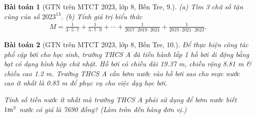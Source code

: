 \documentclass{article}
\newtheorem{baitoan}{Bài toán}
\begin{document}
\begin{baitoan}[GTN trên MTCT 2023, lớp 8, Bến Tre, 9.]
	(a) Tìm 3 chữ số tận cùng của số $2023^{13}$. (b) Tính giá trị biểu thức
	\begin{align*}
		M = \frac{1}{3\cdot5\cdot7} + \frac{1}{5\cdot7\cdot9} + \cdots + \frac{1}{2017\cdot2019\cdot2021} + \frac{1}{2019\cdot2021\cdot2023}.
	\end{align*}
\end{baitoan}

\begin{baitoan}[GTN trên MTCT 2023, lớp 8, Bến Tre, 10.]
	Để thực hiện công tác phổ cập bơi cho học sinh, trường THCS A đã tiến hành lắp 1 hồ bơi di động bằng bạt có dạng hình hộp chữ nhật. Hồ bơi có chiều dài \emph{19.37 m}, chiều rộng \emph{8.81 m} \& chiều cao \emph{1.2 m}. Trường THCS A cần bơm nước vào hồ bơi sao cho mực nước cao ít nhất là \emph{0.85 m} để phục vụ cho việc dạy học bơi.
	
	Tính số tiền nước ít nhất mà trường THCS A phải sử dụng để bơm nước biết $\rm 1m^3$ nước có giá là \emph{7690 đồng}? (Làm tròn đến hàng đơn vị.)
\end{baitoan}


\printbibliography[heading=bibintoc]
	
\end{document}
